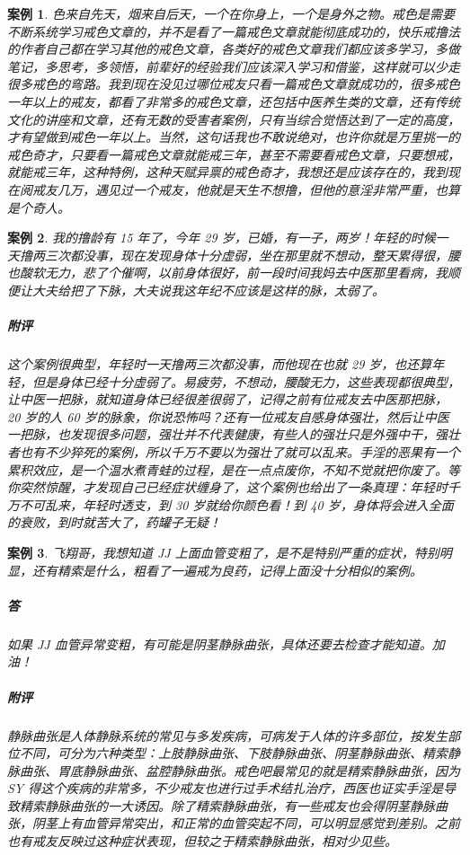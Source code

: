\documentclass{ctexart}
\newtheorem{case}{案例}
\begin{document}
\begin{case}
    色来自先天，烟来自后天，一个在你身上，一个是身外之物。戒色是需要不断系统学习戒色文章的，并不是看了一篇戒色文章就能彻底成功的，快乐戒撸法的作者自己都在学习其他的戒色文章，各类好的戒色文章我们都应该多学习，多做笔记，多思考，多领悟，前辈好的经验我们应该深入学习和借鉴，这样就可以少走很多戒色的弯路。我到现在没见过哪位戒友只看一篇戒色文章就成功的，很多戒色一年以上的戒友，都看了非常多的戒色文章，还包括中医养生类的文章，还有传统文化的讲座和文章，还有无数的受害者案例，只有当综合觉悟达到了一定的高度，才有望做到戒色一年以上。当然，这句话我也不敢说绝对，也许你就是万里挑一的戒色奇才，只要看一篇戒色文章就能戒三年，甚至不需要看戒色文章，只要想戒，就能戒三年，这种特例，这种天赋异禀的戒色奇才，我想还是应该存在的，我到现在阅戒友几万，遇见过一个戒友，他就是天生不想撸，但他的意淫非常严重，也算是个奇人。
\end{case}

\begin{case}
    我的撸龄有 15 年了，今年 29 岁，已婚，有一子，两岁！年轻的时候一天撸两三次都没事，现在发现身体十分虚弱，坐在那里就不想动，整天累得很，腰也酸软无力，悲了个催啊，以前身体很好，前一段时间我妈去中医那里看病，我顺便让大夫给把了下脉，大夫说我这年纪不应该是这样的脉，太弱了。
    \subparagraph{附评} 这个案例很典型，年轻时一天撸两三次都没事，而他现在也就 29 岁，也还算年轻，但是身体已经十分虚弱了。易疲劳，不想动，腰酸无力，这些表现都很典型，让中医一把脉，就知道身体已经很差很弱了，记得之前有位戒友去中医那把脉，20 岁的人 60 岁的脉象，你说恐怖吗？还有一位戒友自感身体强壮，然后让中医一把脉，也发现很多问题，强壮并不代表健康，有些人的强壮只是外强中干，强壮者也有不少猝死的案例，所以千万不要以为强壮了就可以乱来。手淫的恶果有一个累积效应，是一个温水煮青蛙的过程，是在一点点废你，不知不觉就把你废了。等你突然惊醒，才发现自己已经症状缠身了，这个案例也给出了一条真理：年轻时千万不可乱来，年轻时透支，到 30 岁就给你颜色看！到 40 岁，身体将会进入全面的衰败，到时就苦大了，药罐子无疑！
\end{case}

\begin{case}
    飞翔哥，我想知道 JJ 上面血管变粗了，是不是特别严重的症状，特别明显，还有精索是什么，粗看了一遍戒为良药，记得上面没十分相似的案例。
    \subparagraph{答} 如果 JJ 血管异常变粗，有可能是阴茎静脉曲张，具体还要去检查才能知道。加油！
    \subparagraph{附评} 静脉曲张是人体静脉系统的常见与多发疾病，可病发于人体的许多部位，按发生部位不同，可分为六种类型：上肢静脉曲张、下肢静脉曲张、阴茎静脉曲张、精索静脉曲张、胃底静脉曲张、盆腔静脉曲张。戒色吧最常见的就是精索静脉曲张，因为 SY 得这个疾病的非常多，不少戒友也进行过手术结扎治疗，西医也证实手淫是导致精索静脉曲张的一大诱因。除了精索静脉曲张，有一些戒友也会得阴茎静脉曲张，阴茎上有血管异常突出，和正常的血管突起不同，可以明显感觉到差别。之前也有戒友反映过这种症状表现，但较之于精索静脉曲张，相对少见些。
\end{case}
\end{document}
